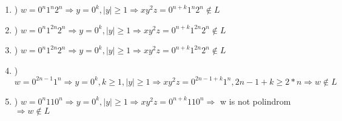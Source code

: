 \documentclass[a4paper]{article}
\begin{document}
\begin{enumerate}[label=\Alph*]

\item{)}
$w = 0^{n}1^n2^n \Rightarrow y = 0^k , |y| \geq 1 \Rightarrow xy^2z =  0^{n+k}1^n2^n \notin L$


\item{)}
$w = 0^{n}1^{2n}2^n \Rightarrow y = 0^k , |y| \geq 1 \Rightarrow xy^2z =  0^{n+k}1^{2n}2^n \notin L$


\item{)}
$w = 0^{n}1^{2n}2^n \Rightarrow y = 0^k , |y| \geq 1 \Rightarrow xy^2z =  0^{n+k}1^{2n}2^n \notin L$

\item{)}
$w = 0^{2n-1}1^{n} \Rightarrow y = 0^k, k \geq 1 , |y| \geq 1 \Rightarrow xy^2z =  0^{2n - 1+ k}1^{n} , 2n - 1 + k \geq 2*n  \Rightarrow w \notin L$

\item{)}
$w = 0^{n}110^{n} \Rightarrow y = 0^k , |y| \geq 1 \Rightarrow xy^2z =  0^{n+k}110^{n} \Rightarrow$
w is not polindrom 
$\Rightarrow w \notin L$


\end{enumerate}
\end{document}
